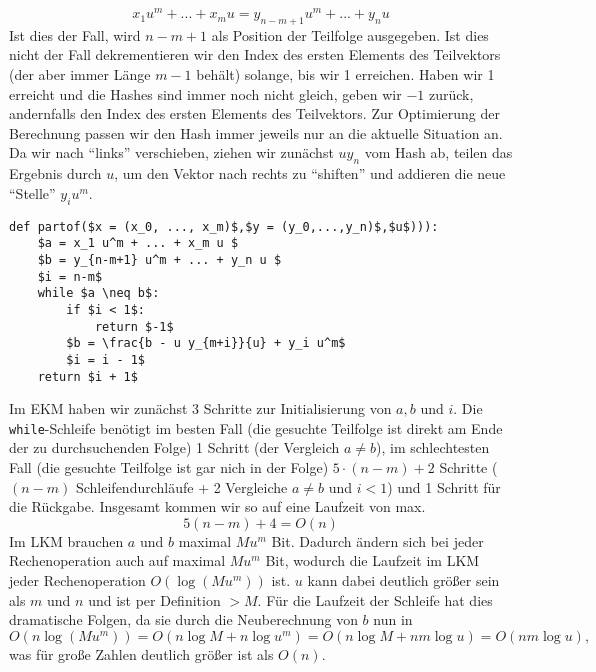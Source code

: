 \documentclass[a4paper,10pt]{scrartcl}
\begin{document}
\begin{enumerate}
         \[x_1 u^m + ... + x_m u = y_{n-m+1} u^m + ... + y_n u\]
         Ist dies der Fall, wird $n-m+1$ als Position der Teilfolge ausgegeben. Ist dies nicht der Fall dekrementieren wir den Index des ersten Elements des Teilvektors (der aber immer Länge $m-1$ behält) solange, bis wir 1 erreichen. Haben wir 1 erreicht und die Hashes sind immer noch nicht gleich, geben wir $-1$ zurück, andernfalls den Index des ersten Elements des Teilvektors.
         Zur Optimierung der Berechnung passen wir den Hash immer jeweils nur an die aktuelle Situation an.
         Da wir nach "`links"' verschieben, ziehen wir zunächst $u y_{n}$ vom Hash ab, teilen das Ergebnis durch $u$, um den Vektor nach rechts zu "`shiften"' und addieren die neue "`Stelle"' $y_i u^m$.
        \begin{lstlisting}[mathescape=true]
def partof($x = (x_0, ..., x_m)$,$y = (y_0,...,y_n)$,$u$))):
    $a = x_1 u^m + ... + x_m u $
    $b = y_{n-m+1} u^m + ... + y_n u $
    $i = n-m$
    while $a \neq b$:
        if $i < 1$:
            return $-1$
        $b = \frac{b - u y_{m+i}}{u} + y_i u^m$
        $i = i - 1$
    return $i + 1$
        \end{lstlisting}
        Im EKM haben wir zunächst 3 Schritte zur Initialisierung von $a, b$ und $i$. Die \lstinline!while!-Schleife benötigt im besten Fall (die gesuchte Teilfolge ist direkt am Ende der zu durchsuchenden Folge) 1 Schritt (der Vergleich $a \neq b$), im schlechtesten Fall (die gesuchte Teilfolge ist gar nich in der Folge) $5 \cdot (n-m) + 2$ Schritte ($(n-m)$  Schleifendurchläufe + 2 Vergleiche $a \neq b$ und $i < 1$) und 1 Schritt für die Rückgabe. Insgesamt kommen wir so auf eine Laufzeit von max.
        \[5(n-m) + 4 = O(n)\] 
        Im LKM brauchen $a$ und $b$ maximal $M u^m$ Bit. Dadurch ändern sich bei jeder Rechenoperation auch auf maximal $M u^m$ Bit, wodurch die Laufzeit im LKM jeder Rechenoperation $O(\log(Mu^m))$ ist. $u$ kann dabei deutlich größer sein als $m$ und $n$ und ist per Definition $> M$. Für die Laufzeit der Schleife hat dies dramatische Folgen, da sie durch die Neuberechnung von $b$ nun
        in \[O(n \log(Mu^m)) = O(n \log M + n \log u^m) = O(n \log M + n m \log u) = O(n m \log u),\] was für große Zahlen deutlich größer ist als $O(n)$.
\end{enumerate}
\end{document}
